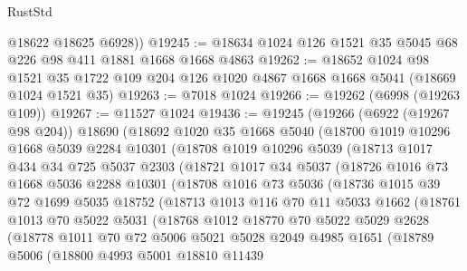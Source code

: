 \begin{lexlean}{RustStd}
\begin{coremodule}
        @18622
        @18625
        @6928))
@19245 := @18634 @1024 @126 @1521 @35 @5045 @68 @226 @98 @411 @1881 @1668 @1668 @4863
@19262 := @18652
    @1024
    @98
    @1521
    @35
    @1722
    @109
    @204
    @126
    @1020
    @4867
    @1668
    @1668
    @5041
    (@18669 @1024 @1521 @35)
@19263 := @7018 @1024
@19266 := @19262 (@6998 (@19263 @109))
@19267 := @11527 @1024
@19436 := @19245
    (@19266
      (@6922 (@19267 @98 @204))
      @18690
      (@18692
        @1020
        @35
        @1668
        @5040
        (@18700
          @1019
          @10296
          @1668
          @5039
          @2284
          @10301
          (@18708
            @1019
            @10296
            @5039
            (@18713
              @1017
              @434
              @34
              @725
              @5037
              @2303
              (@18721
                @1017
                @34
                @5037
                (@18726
                  @1016
                  @73
                  @1668
                  @5036
                  @2288
                  @10301
                  (@18708
                    @1016
                    @73
                    @5036
                    (@18736
                      @1015
                      @39
                      @72
                      @1699
                      @5035
                      @18752
                      (@18713
                        @1013
                        @116
                        @70
                        @11
                        @5033
                        @1662
                        (@18761
                          @1013
                          @70
                          @5022
                          @5031
                          (@18768
                            @1012
                            @18770
                            @70
                            @5022
                            @5029
                            @2628
                            (@18778
                              @1011
                              @70
                              @72
                              @5006
                              @5021
                              @5028
                              @2049
                              @4985
                              @1651
                              (@18789
                                @5006
                                (@18800
                                  @4993
                                  @5001
                                  @18810
                                  @11439

\end{coremodule}
\end{lexlean}
